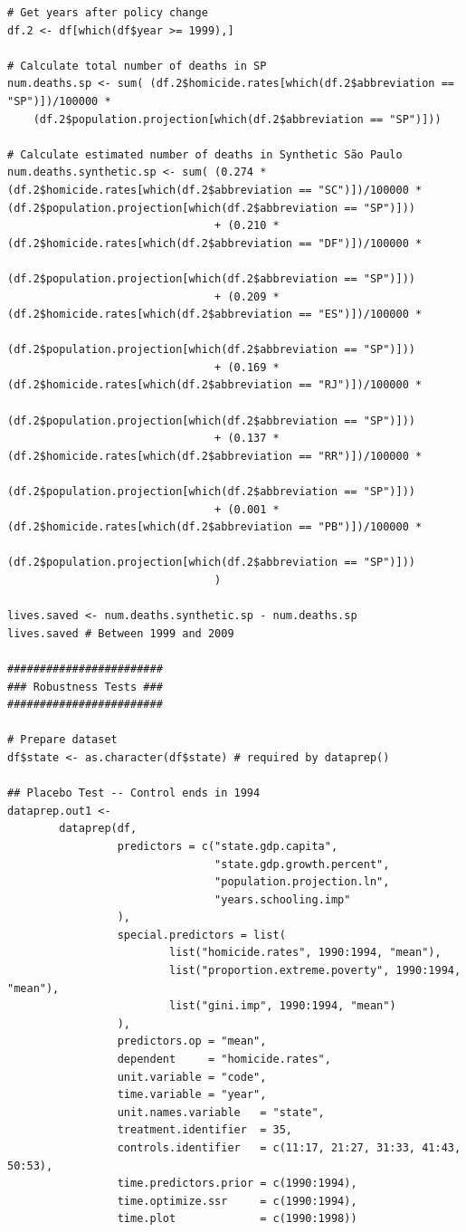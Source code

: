 \begin{verbatim}
# Get years after policy change
df.2 <- df[which(df$year >= 1999),]

# Calculate total number of deaths in SP
num.deaths.sp <- sum( (df.2$homicide.rates[which(df.2$abbreviation == "SP")])/100000 *
    (df.2$population.projection[which(df.2$abbreviation == "SP")]))

# Calculate estimated number of deaths in Synthetic São Paulo
num.deaths.synthetic.sp <- sum( (0.274 * (df.2$homicide.rates[which(df.2$abbreviation == "SC")])/100000 *
(df.2$population.projection[which(df.2$abbreviation == "SP")]))
                                + (0.210 * (df.2$homicide.rates[which(df.2$abbreviation == "DF")])/100000 *
                                (df.2$population.projection[which(df.2$abbreviation == "SP")]))
                                + (0.209 * (df.2$homicide.rates[which(df.2$abbreviation == "ES")])/100000 *
                                (df.2$population.projection[which(df.2$abbreviation == "SP")]))
                                + (0.169 * (df.2$homicide.rates[which(df.2$abbreviation == "RJ")])/100000 *
                                (df.2$population.projection[which(df.2$abbreviation == "SP")]))
                                + (0.137 * (df.2$homicide.rates[which(df.2$abbreviation == "RR")])/100000 *
                                (df.2$population.projection[which(df.2$abbreviation == "SP")]))
                                + (0.001 * (df.2$homicide.rates[which(df.2$abbreviation == "PB")])/100000 *
                                (df.2$population.projection[which(df.2$abbreviation == "SP")]))
                                )

lives.saved <- num.deaths.synthetic.sp - num.deaths.sp
lives.saved # Between 1999 and 2009

########################
### Robustness Tests ###
########################

# Prepare dataset
df$state <- as.character(df$state) # required by dataprep()

## Placebo Test -- Control ends in 1994
dataprep.out1 <-
        dataprep(df,
                 predictors = c("state.gdp.capita",
                                "state.gdp.growth.percent",
                                "population.projection.ln",
                                "years.schooling.imp"
                 ),
                 special.predictors = list(
                         list("homicide.rates", 1990:1994, "mean"),
                         list("proportion.extreme.poverty", 1990:1994, "mean"),
                         list("gini.imp", 1990:1994, "mean")
                 ),
                 predictors.op = "mean",
                 dependent     = "homicide.rates",
                 unit.variable = "code",
                 time.variable = "year",
                 unit.names.variable   = "state",
                 treatment.identifier  = 35,
                 controls.identifier   = c(11:17, 21:27, 31:33, 41:43, 50:53),
                 time.predictors.prior = c(1990:1994),
                 time.optimize.ssr     = c(1990:1994),
                 time.plot             = c(1990:1998))


\end{verbatim}
